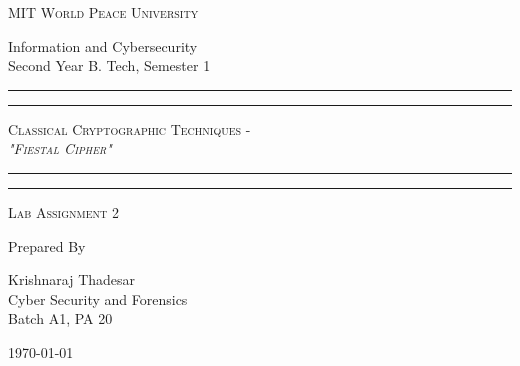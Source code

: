 \documentclass[11pt]{article}
\begin{document}
\begin{titlepage}
	\centering


	\huge\textsc{
		MIT World Peace University
	}\\

	\vspace{0.75\baselineskip} %

	\LARGE{
		Information and Cybersecurity\\
		Second Year B. Tech, Semester 1
	}

	\vfill %


	\rule{\textwidth}{1.6pt}\vspace*{-\baselineskip}\vspace*{2pt}
	\rule{\textwidth}{0.6pt}
	\vspace{0.75\baselineskip} %



	\huge{\textsc{
			Classical Cryptographic Techniques - \\
			\textit{"Fiestal Cipher"}
		}} \\



	\vspace{0.5\baselineskip} %
	\rule{\textwidth}{0.6pt}\vspace*{-\baselineskip}\vspace*{2.8pt}
	\rule{\textwidth}{1.6pt}

	\vspace{1\baselineskip} %


	\LARGE\textsc{
		Lab Assignment 2
	} %
	\vfill


	Prepared By
	\vspace{0.5\baselineskip} %

	\Large{
		Krishnaraj Thadesar \\
		Cyber Security and Forensics\\
		Batch A1, PA 20
	}


	\vspace{0.5\baselineskip} %
	\today

\end{titlepage}
\end{document}
